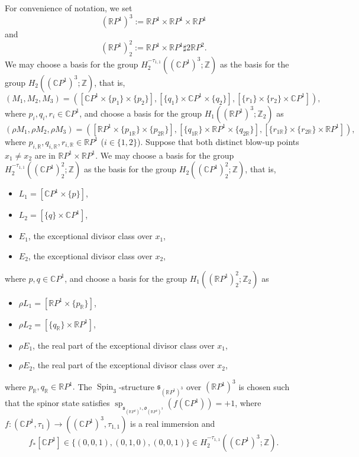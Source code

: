 \documentclass[11pt]{amsart}
\numberwithin{equation}{section}
\theoremstyle{definition}
\theoremstyle{plain}
\theoremstyle{remark}
\newcommand{\R}{\mathbb{R}}
\newcommand{\Z}{\mathbb{Z}}
\newcommand{\C}{\mathbb{C}}
\DeclareMathOperator{\Spin}{Spin}
\renewcommand{\sp}{\operatorname{sp}}
\begin{document}
For convenience of notation, we set 
 $$\left(\R P^1\right)^3:=\R P^1\times \R P^1 \times \R P^1$$
and  
$$\left(\R P^1\right)^2_2:=\R P^1\times \R P^1 \sharp 2 {\R P^2}.$$
We may choose a basis for the group $H_2^{-\tau_{1,1} }((\C P^1)^3;\Z)$ as the basis for the group $H_2((\C P^1)^3;\Z)$, that is,
    $$(M_1,M_2,M_3)=\left(\left[\C P^1\times \{p_1\}\times \{p_2\}\right],\left[\{q_1\}\times \C P^1\times \{q_2\}\right],\left[\{r_1\}\times \{r_2\}\times \C P^1\right]\right),$$
    where $p_i,q_i,r_i \in \C P^1$,
and choose a basis for the group  $H_1((\R P^1)^3;\Z_2)$ as
 $$(\rho M_1,\rho M_2,\rho M_3)=\left(\left[\R P^1\times \{p_{1\R}\}\times \{p_{2\R}\}\right],\left[\{q_{1\R}\}\times \R P^1\times \{q_{2\R}\}\right],\left[\{r_{1\R}\}\times \{r_{2\R}\}\times \R P^1\right]\right),$$
    where $p_{i,\R},q_{i,\R},r_{i,\R} \in \R P^1$ ($i\in \{1,2\}$).
Suppose that both distinct blow-up points $x_1\neq x_2$  are in $\R P^1\times \R P^1$. We may choose a basis for the group $H_2^{-\tau_{1,1}}((\C P^1)_2^2;\Z)$ as the basis for the group $H_2((\C P^1)_2^2;\Z)$, that is,
\begin{itemize}
    \item  $L_1=[\C P^1\times \{p\}]$,
     \item $L_2=[\{q\}\times \C P^1]$,
      \item $E_1$, the exceptional divisor class over $x_1$,
       \item $E_2$, the exceptional divisor class over $x_2$,
\end{itemize}
where $p,q \in \C P^1$,
and choose a basis for the group  $H_1((\R P^1)_2^2;\Z_2)$ as
\begin{itemize}
    \item  $\rho L_1=[\R P^1\times \{p_\R\}]$,
     \item $\rho L_2=[\{q_\R\}\times \R P^1]$,
      \item $\rho E_1$,  the real part of the exceptional divisor class over $x_1$,
      \item $\rho E_2$,  the real part of the exceptional divisor class over $x_2$,
\end{itemize}
where $p_\R , q_\R \in \R P^1.$
The $\Spin_3$-structure $\mathfrak{s}_{(\R P^1)^3}$ over $(\R P^1)^3$ is chosen such that the spinor state satisfies $\sp_{\mathfrak{s}_{(\R P^1)^3},\mathfrak{o}_{(\R P^1)^3}}(f(\C P^1))=+1$, where $f\colon (\C P^1,\tau_1)\to ((\C P^1)^3,\tau_{1,1})$ is a real immersion and
$$f_*\left[\C P^1\right]\in \{(0,0,1),(0,1,0),(0,0,1)\}\in H_2^{-\tau_{1,1}}\left(\left(\C P^1\right)^3;\Z\right).$$ 
\end{document}
